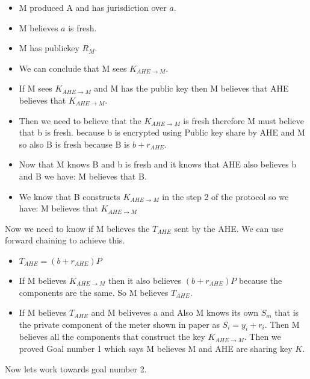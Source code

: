 \documentclass[a4paper, 11pt]{article}
\begin{document}
\begin{itemize}
    \item M produced A and has jurisdiction over $a$.
    \item M believes $a$ is fresh.
    \item M has publickey $R_M$.
    \item We can conclude that M sees $K_{AHE \rightarrow M}$.
    \item If M sees $K_{AHE \rightarrow M}$ and M has the public key then
        M believes that AHE believes that $K_{AHE \rightarrow M}$.
    \item Then we need to believe that the $K_{AHE \rightarrow M}$ is
        fresh therefore M must believe that b is fresh. because
        b is encrypted using Public key share by AHE and M so also
        B is fresh because B is $b + r_{AHE}$.
    \item Now that M knows B and b is fresh and it knows that AHE also
        believes b and B we have: M believes that B.
    \item We know that B constructs $K_{AHE \rightarrow M}$ in the step 2 of
        the protocol so we have: M believes that $K_{AHE \rightarrow M}$
\end{itemize}
Now we need to know if M believes the $T_{AHE}$ sent by the AHE.
We can use forward chaining to achieve this.
\begin{itemize}
    \item $T_{AHE} = (b + r_{AHE}) P$
    \item If M believes $K_{AHE \rightarrow M}$ then it also believes
        $(b + r_{AHE})P$ because the components are the same. So M believes
        $T_{AHE}$.
    \item If M believes $T_{AHE}$ and M beliveves a and Also M knows its own
        $S_{m}$ that is the private component of the meter shown in paper
        as $S_i = y_i + r_i$. Then M believes all the components that construct
        the key $K_{AHE \rightarrow M}$. Then we proved Goal number 1
        which says M believes M and AHE are sharing key $K$.
\end{itemize}
Now lets work towards goal number 2.
\end{document}
